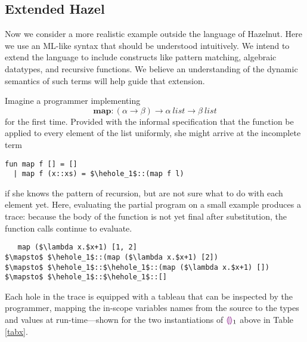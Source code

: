 \subsection{Extended Hazel}
Now we consider a more realistic example outside the language of
Hazelnut. Here we use an ML-like syntax that should be understood
intuitively. We intend to extend the language to include constructs like
pattern matching, algebraic datatypes, and recursive functions. We believe
an understanding of the dynamic semantics of such terms will help guide
that extension.

Imagine a programmer implementing $$\mathbf{map} : (\alpha \to \beta) \to
\alpha ~\mathit{list} \to \beta ~\mathit{list}$$ for the first time.
Provided with the informal specification that the function be applied to
every element of the list uniformly, she might arrive at the incomplete
term
\begin{lstlisting}
fun map f [] = []
  | map f (x::xs) = $\hehole_1$::(map f l)
\end{lstlisting}
if she knows the pattern of recursion, but are not sure what to do with
each element yet. Here, evaluating the partial program on a small example
produces a trace: because the body of the function is not yet final after
substitution, the function calls continue to evaluate.
\begin{lstlisting}
   map ($\lambda x.$x+1) [1, 2]
$\mapsto$ $\hehole_1$::(map ($\lambda x.$x+1) [2])
$\mapsto$ $\hehole_1$::$\hehole_1$::(map ($\lambda x.$x+1) [])
$\mapsto$ $\hehole_1$::$\hehole_1$::[]
\end{lstlisting}
Each hole in the trace is equipped with a tableau that can be inspected by
the programmer, mapping the in-scope variables names from the source to the
types and values at run-time---shown for the two instantiations of
$\textcolor{violet}{\llparenthesis}\textcolor{violet}{\rrparenthesis}_1$ above in Table \ref{tabx}.

